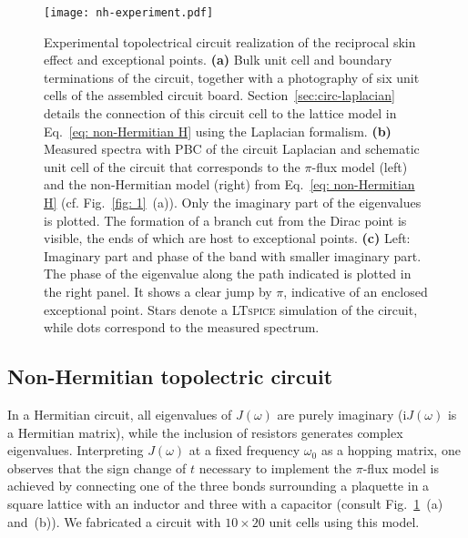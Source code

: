 \begin{figure}[H]
\centering
\texttt{[image: nh-experiment.pdf]}
\caption[Experimental topolectrical circuit realization of the reciprocal skin effect and exceptional points]{Experimental topolectrical circuit realization of the reciprocal skin effect and exceptional points. \textbf{(a)} Bulk unit cell and boundary terminations of the circuit, together with a photography of six unit cells of the assembled circuit board. Section~\ref{sec:circ-laplacian} details the connection of this circuit cell to the lattice model in Eq.~\eqref{eq: non-Hermitian H} using the Laplacian formalism. \textbf{(b)} Measured spectra with PBC of the circuit Laplacian and schematic unit cell of the circuit that corresponds to the $\pi$-flux model (left) and the non-Hermitian model (right) from Eq.~\eqref{eq: non-Hermitian H} (cf. Fig.~\ref{fig: 1}~(a)). Only the imaginary part of the eigenvalues is plotted. The formation of a branch cut from the Dirac point is visible, the ends of which are host to exceptional points. \textbf{(c)} Left: Imaginary part and phase of the band with smaller imaginary part. The phase of the eigenvalue along the path indicated is plotted in the right panel. It shows a clear jump by $\pi$, indicative of an enclosed exceptional point. Stars denote a \textsc{LTspice} simulation of the circuit, while dots correspond to the measured spectrum.}
\label{fig: 2}
\end{figure}

\subsection{Non-Hermitian topolectric circuit}
In a Hermitian circuit, all eigenvalues of $J(\omega)$ are purely imaginary ($\mathrm{i}J(\omega)$ is a Hermitian matrix), while the inclusion of resistors generates complex eigenvalues. Interpreting $J (\omega)$ at a fixed frequency $\omega_0$ as a hopping matrix, one observes that the sign change of $t$ necessary to implement the $\pi$-flux model is achieved by connecting one of the three bonds surrounding a plaquette in a square lattice with an inductor and three with a capacitor (consult Fig.~\ref{fig: 2}~(a) and~(b)). We fabricated a circuit with $10 \times 20$ unit cells using this model.

